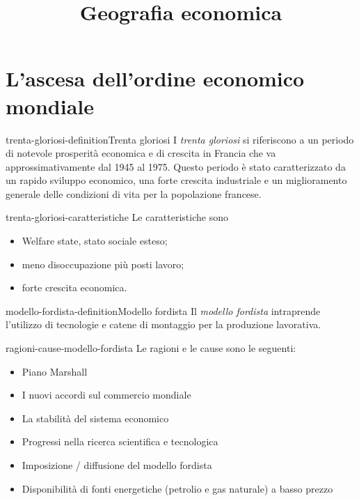 \documentclass[preview]{standalone}
\begin{document}
\title{Geografia economica}
\genpage

\section{L'ascesa dell'ordine economico mondiale}

\begin{snippetdefinition}{trenta-gloriosi-definition}{Trenta gloriosi}
    I \textit{trenta gloriosi} si riferiscono a un periodo di notevole prosperità economica e di crescita in Francia
    che va approssimativamente dal 1945 al 1975. Questo periodo è stato caratterizzato da un rapido
    sviluppo economico, una forte crescita industriale e un miglioramento generale delle condizioni di
    vita per la popolazione francese.
\end{snippetdefinition}

\begin{snippet}{trenta-gloriosi-caratteristiche}
    Le caratteristiche sono
    \begin{itemize}
        \item Welfare state, stato sociale esteso;
        \item meno disoccupazione più posti lavoro;
        \item forte crescita economica.
    \end{itemize}
\end{snippet}

\begin{snippetdefinition}{modello-fordista-definition}{Modello fordista}
    Il \textit{modello fordista} intraprende l'utilizzo di tecnologie e catene di montaggio
    per la produzione lavorativa.
\end{snippetdefinition}

\begin{snippet}{ragioni-cause-modello-fordista}
    Le ragioni e le cause sono le seguenti:
    \begin{itemize}
        \item Piano Marshall
        \item I nuovi accordi sul commercio mondiale
        \item La stabilità del sistema economico
        \item Progressi nella ricerca scientifica e tecnologica
        \item Imposizione / diffusione del modello fordista
        \item Disponibilità di fonti energetiche (petrolio e gas naturale) a basso prezzo
    \end{itemize}
\end{snippet}
\end{document}
